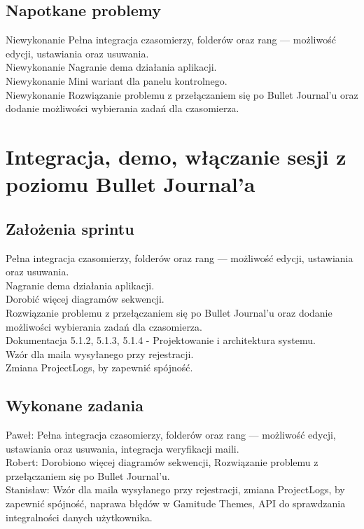\documentclass[a4paper,11pt]{report}
\begin{document}
\subsection {Napotkane problemy}
Niewykonanie Pełna integracja czasomierzy, folderów oraz rang — możliwość edycji, ustawiania oraz usuwania.\\
Niewykonanie Nagranie dema działania aplikacji.\\
Niewykonanie Mini wariant dla panelu kontrolnego.\\
Niewykonanie Rozwiązanie problemu z przełączaniem się po Bullet Journal'u oraz dodanie możliwości wybierania zadań dla czasomierza.\\

\section {Integracja, demo, włączanie sesji z poziomu Bullet Journal’a}
\subsection {Założenia sprintu}
Pełna integracja czasomierzy, folderów oraz rang — możliwość edycji, ustawiania oraz usuwania.\\
Nagranie dema działania aplikacji.\\
Dorobić więcej diagramów sekwencji.\\
Rozwiązanie problemu z przełączaniem się po Bullet Journal'u oraz dodanie możliwości wybierania zadań dla czasomierza.\\
Dokumentacja 5.1.2, 5.1.3, 5.1.4 - Projektowanie i architektura systemu.\\
Wzór dla maila wysyłanego przy rejestracji.\\
Zmiana ProjectLogs, by zapewnić spójność.\\
\subsection {Wykonane zadania}
Paweł: Pełna integracja czasomierzy, folderów oraz rang — możliwość edycji, ustawiania oraz usuwania, integracja weryfikacji maili.\\
Robert: Dorobiono więcej diagramów sekwencji, Rozwiązanie problemu z przełączaniem się po Bullet Journal'u.\\
Stanisław: Wzór dla maila wysyłanego przy rejestracji, zmiana ProjectLogs, by zapewnić spójność, naprawa błędów w Gamitude Themes, API do sprawdzania integralności danych użytkownika.\\
\end{document}
